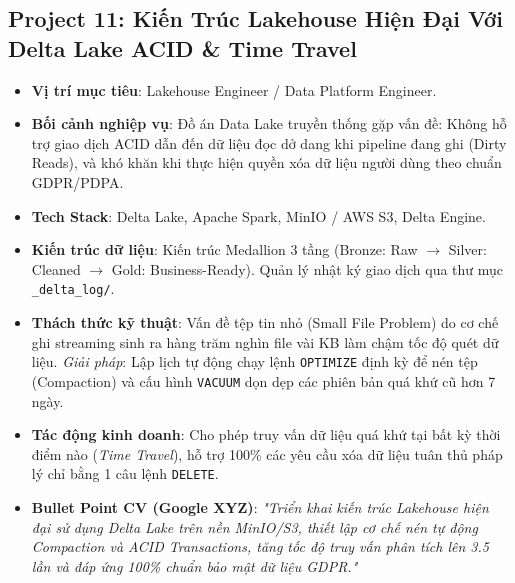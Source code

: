 \subsection{Project 11: Kiến Trúc Lakehouse Hiện Đại Với Delta Lake ACID \& Time Travel}
\begin{itemize}
    \item \textbf{Vị trí mục tiêu}: Lakehouse Engineer / Data Platform Engineer.
    \item \textbf{Bối cảnh nghiệp vụ}: Đồ án Data Lake truyền thống gặp vấn đề: Không hỗ trợ giao dịch ACID dẫn đến dữ liệu đọc dở dang khi pipeline đang ghi (Dirty Reads), và khó khăn khi thực hiện quyền xóa dữ liệu người dùng theo chuẩn GDPR/PDPA.
    \item \textbf{Tech Stack}: Delta Lake, Apache Spark, MinIO / AWS S3, Delta Engine.
    \item \textbf{Kiến trúc dữ liệu}: Kiến trúc Medallion 3 tầng (Bronze: Raw $\rightarrow$ Silver: Cleaned $\rightarrow$ Gold: Business-Ready). Quản lý nhật ký giao dịch qua thư mục \texttt{\_delta\_log/}.
    \item \textbf{Thách thức kỹ thuật}: Vấn đề tệp tin nhỏ (Small File Problem) do cơ chế ghi streaming sinh ra hàng trăm nghìn file vài KB làm chậm tốc độ quét dữ liệu. \textit{Giải pháp}: Lập lịch tự động chạy lệnh \texttt{OPTIMIZE} định kỳ để nén tệp (Compaction) và cấu hình \texttt{VACUUM} dọn dẹp các phiên bản quá khứ cũ hơn 7 ngày.
    \item \textbf{Tác động kinh doanh}: Cho phép truy vấn dữ liệu quá khứ tại bất kỳ thời điểm nào (\textit{Time Travel}), hỗ trợ 100\% các yêu cầu xóa dữ liệu tuân thủ pháp lý chỉ bằng 1 câu lệnh \texttt{DELETE}.
    \item \textbf{Bullet Point CV (Google XYZ)}: \textit{"Triển khai kiến trúc Lakehouse hiện đại sử dụng Delta Lake trên nền MinIO/S3, thiết lập cơ chế nén tự động Compaction và ACID Transactions, tăng tốc độ truy vấn phân tích lên 3.5 lần và đáp ứng 100\% chuẩn bảo mật dữ liệu GDPR."}
\end{itemize}

